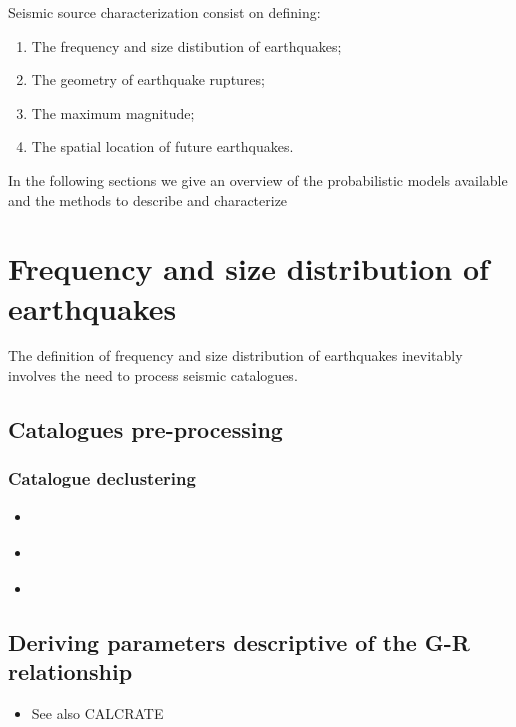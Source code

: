Seismic source characterization consist on defining: 
\begin{enumerate}
\item The frequency and size distibution of earthquakes;
\item The geometry of earthquake ruptures;
\item The maximum magnitude;
\item The spatial location of future earthquakes.
\end{enumerate}
In the following sections we give an overview of the probabilistic models 
available and the methods to describe and characterize 

%
\newpage
\section{Frequency and size distribution of earthquakes}
The definition of frequency and size distribution of earthquakes inevitably 
involves the need to process seismic catalogues. 
%
\subsection{Catalogues pre-processing}

\subsubsection{Catalogue declustering}
\begin{itemize}
\item \cite{gardner74}
\item \cite{reasenberg85}
\item \cite{kagan10}
\end{itemize}

\subsection{Deriving parameters descriptive of the G-R relationship}
\begin{itemize}
\item \cite{weichert80}
See also CALCRATE \citep{bender87,hanson92}
\end{itemize}

%
\newpage
